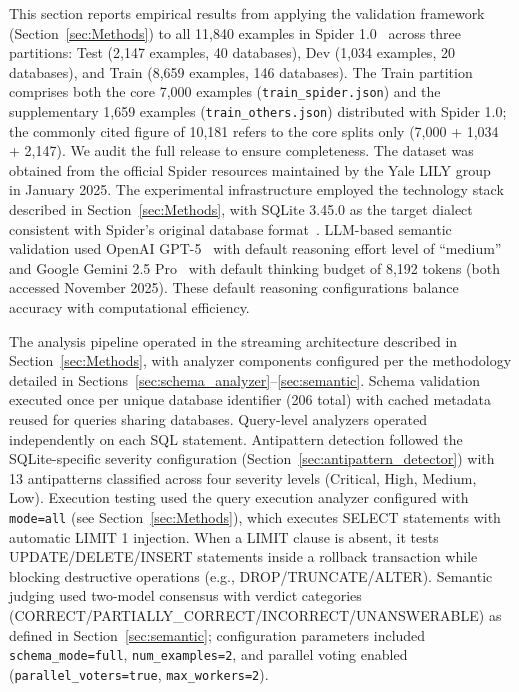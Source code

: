 \documentclass[print]{einformatica}
\begin{document}
This section reports empirical results from applying the validation framework (Section~\ref{sec:Methods}) to all 11,840 examples in Spider 1.0~\cite{yu2018spider} across three partitions: Test (2,147 examples, 40 databases), Dev (1,034 examples, 20 databases), and Train (8,659 examples, 146 databases). The Train partition comprises both the core 7,000 examples (\texttt{train\_spider.json}) and the supplementary 1,659 examples (\texttt{train\_others.json}) distributed with Spider 1.0; the commonly cited figure of 10,181 refers to the core splits only (7,000 + 1,034 + 2,147). We audit the full release to ensure completeness. The dataset was obtained from the official Spider resources maintained by the Yale LILY group~\cite{spiderLeaderboard} in January 2025. The experimental infrastructure employed the technology stack described in Section~\ref{sec:Methods}, with SQLite 3.45.0 as the target dialect consistent with Spider's original database format~\cite{yu2018spider,sqliteForeignKeys}. LLM-based semantic validation used OpenAI GPT-5~\cite{openaiModelsDocs} with default reasoning effort level of ``medium'' and Google Gemini 2.5 Pro~\cite{geminiApiDocs} with default thinking budget of 8,192 tokens (both accessed November 2025). These default reasoning configurations balance accuracy with computational efficiency.

The analysis pipeline operated in the streaming architecture described in Section~\ref{sec:Methods}, with analyzer components configured per the methodology detailed in Sections~\ref{sec:schema_analyzer}--\ref{sec:semantic}. Schema validation executed once per unique database identifier (206 total) with cached metadata reused for queries sharing databases. Query-level analyzers operated independently on each SQL statement. Antipattern detection followed the SQLite-specific severity configuration (Section~\ref{sec:antipattern_detector}) with 13 antipatterns classified across four severity levels (Critical, High, Medium, Low). Execution testing used the query execution analyzer configured with \texttt{mode=all} (see Section~\ref{sec:Methods}), which executes SELECT statements with automatic LIMIT 1 injection. When a LIMIT clause is absent, it tests UPDATE/DELETE/INSERT statements inside a rollback transaction while blocking destructive operations (e.g., DROP/\allowbreak TRUNCATE/\allowbreak ALTER). Semantic judging used two-model consensus with verdict categories (CORRECT/\allowbreak PARTIALLY\_CORRECT/\allowbreak INCORRECT/\allowbreak UNANSWERABLE) as defined in Section~\ref{sec:semantic}; configuration parameters included \texttt{schema\_mode=full}, \texttt{num\_examples=2}, and parallel voting enabled (\texttt{parallel\_voters=true}, \texttt{max\_workers=2}).
\end{document}
